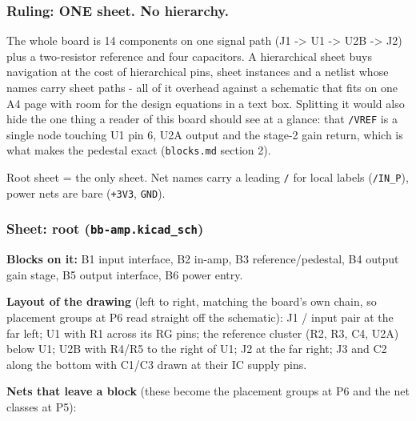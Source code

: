 \documentclass[11pt,a4paper]{article}
\begin{document}
\subsubsection*{Ruling: ONE sheet. No hierarchy.}
The whole board is 14 components on one signal path (J1 -\textgreater{} U1 -\textgreater{} U2B -\textgreater{} J2) plus a two-resistor reference and four capacitors. A hierarchical sheet buys navigation at the cost of hierarchical pins, sheet instances and a netlist whose names carry sheet paths - all of it overhead against a schematic that fits on one A4 page with room for the design equations in a text box. Splitting it would also hide the one thing a reader of this board should see at a glance: that \texttt{/VREF} is a single node touching U1 pin 6, U2A output and the stage-2 gain return, which is what makes the pedestal exact (\texttt{blocks.md} section 2).

Root sheet = the only sheet. Net names carry a leading \texttt{/} for local labels (\texttt{/IN\_P}), power nets are bare (\texttt{+3V3}, \texttt{GND}).

\subsubsection*{Sheet: root (\texttt{bb-amp.kicad\_sch})}
\textbf{Blocks on it:} B1 input interface, B2 in-amp, B3 reference/pedestal, B4 output gain stage, B5 output interface, B6 power entry.

\textbf{Layout of the drawing} (left to right, matching the board's own chain, so placement groups at P6 read straight off the schematic): J1 / input pair at the far left; U1 with R1 across its RG pins; the reference cluster (R2, R3, C4, U2A) below U1; U2B with R4/R5 to the right of U1; J2 at the far right; J3 and C2 along the bottom with C1/C3 drawn at their IC supply pins.

\textbf{Nets that leave a block} (these become the placement groups at P6 and the net classes at P5):
\end{document}
